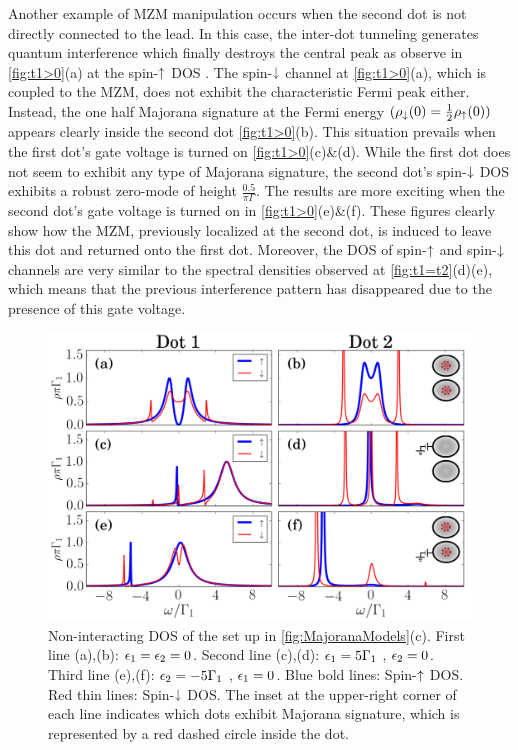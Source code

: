 Another example of MZM manipulation occurs when the second dot is not directly connected to the lead. In this case, the inter-dot tunneling generates quantum interference which finally destroys the central peak as observe in \ref{fig:t1>0}(a) at the spin-$\uparrow$ DOS . The spin-$\downarrow$ channel at \ref{fig:t1>0}(a), which is coupled to the MZM, does not exhibit the characteristic Fermi peak either. Instead, the one half Majorana signature at the Fermi energy $(\rho_\downarrow(0) = \frac{1}{2}\rho_\uparrow(0))$ appears clearly inside the second dot \ref{fig:t1>0}(b). This situation prevails when the first dot's gate voltage is turned on \ref{fig:t1>0}(c)\&(d). While the first dot does not seem to exhibit any type of Majorana signature, the second dot's spin-$\downarrow$ DOS exhibits a robust zero-mode of height $\frac{0.5}{\pi \Gamma}$. The results are more exciting when the second dot's gate voltage is turned on in \ref{fig:t1>0}(e)\&(f). These figures clearly show how the MZM, previously localized at the second dot, is induced to leave this dot and returned onto the first dot. Moreover, the DOS of spin-$\uparrow$ and spin-$\downarrow$ channels are very similar to the spectral densities observed at \ref{fig:t1=t2}(d)(e), which means that the previous interference pattern has disappeared due to the presence of this gate voltage. 

\begin{figure}[bt]
    \begin{center}
    \includegraphics[scale=0.45]{IMAGES/GreenResults/t2>0.png}
    \caption{  \label{fig:t2>0}  Non-interacting DOS of the set up in \ref{fig:MajoranaModels}(c).  First line (a),(b): $\epsilon_1=\epsilon_2=0$. Second line (c),(d): $\epsilon_1=5\Gamma_1$ , $\epsilon_2=0$. Third line (e),(f): $\epsilon_2=-5\Gamma_1$ , $\epsilon_1=0$.   Blue bold lines: Spin-$\uparrow$ DOS. Red thin lines: Spin-$\downarrow$ DOS. The inset at the upper-right corner of each line indicates which dots  exhibit  Majorana signature, which is represented by a red dashed circle inside the dot. \protect{}
    }
    
    \end{center}
\end{figure}



